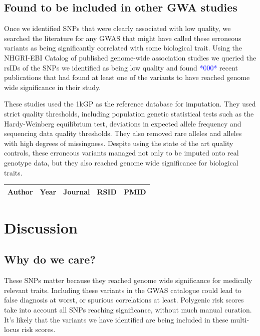 \documentclass[9pt,lineno]{elife}
\newcommand{\todo}[1]{\textcolor{blue}{*#1*}}
\begin{document}
	\subsection{Found to be included in other GWA studies}
Once we identified SNPs that were clearly associated with low quality, we searched the literature for any GWAS that might have called these erroneous variants as being significantly correlated with some biological trait. 
Using the NHGRI-EBI Catalog of published genome-wide association studies we queried the rsIDs of the SNPs we identified as being low quality and found \todo{000} recent publications that had found at least one of the variants to have reached genome wide significance in their study.

These studies used the 1kGP as the reference database for imputation. %
They used strict quality thresholds, including population genetic statistical tests such as the Hardy-Weinberg equilibrium test, deviations in expected allele frequency and sequencing data quality thresholds. 
They also removed rare alleles and alleles with high degrees of missingness. 
Despite using the state of the art quality controls, these erroneous variants managed not only to be imputed onto real genotype data, but they also reached genome wide significance for biological traits. 

\begin{center}
 \begin{tabular}{l l l r r} 
 \hline
Author & Year & Journal & RSID & PMID \\ [0.5ex] 
 \hline

 \hline
 \end{tabular}
\end{center}

			\section{Discussion}
\subsection{Why do we care?}
These SNPs matter because they reached genome wide significance for medically relevant traits. 
Including these variants in the GWAS catalogue could lead to false diagnosis at worst, or spurious correlations at least. 
Polygenic risk scores take into account all SNPs reaching significance, without much manual curation. 
It's likely that the variants we have identified are being included in these multi-locus risk scores.
\end{document}
